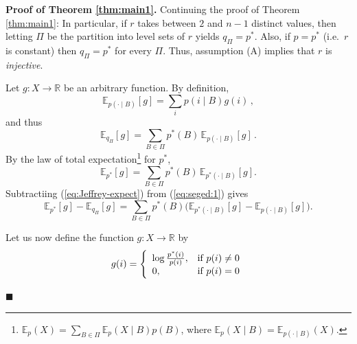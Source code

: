 \documentclass[10pt, letterpaper]{article}%
\theoremstyle{definition}
\renewenvironment{proof}[1][\unskip]{%
\par
\noindent
\textbf{Proof #1.}
\noindent}
{\hfill$\blacksquare$

\bigskip}
\newcommand{\E}{\mathbb E}
\newcommand{\1}{\mathbf 1}
\begin{document}
\begin{proof}[of Theorem \ref{thm:main1}]
	Continuing the proof of Theorem \ref{thm:main1}: In particular, if $r$ takes between $2$ and $n-1$ distinct values, then letting $\Pi$ be the partition into
	level sets of $r$ yields $q_\Pi=p^*$. Also, if $p=p^*$ (i.e.\ $r$ is constant) then $q_\Pi=p^*$ for every $\Pi$.
	Thus, assumption (A) implies that $r$ is \emph{injective}.
	
	\noindent Let $g:X\to \mathbb{R}$ be an arbitrary function. By definition,
	\begin{equation}
	    \E_{p(\cdot\mid B)}[g] = \sum_{i}p(i\mid B)g(i)\,,
	\end{equation}
	and thus
	\begin{equation}\label{eq:Jeffrey-expect}
		\E_{q_\Pi}[g]=\sum_{B\in\Pi} p^*(B)\,\E_{p(\cdot\mid B)}[g]\,.
	\end{equation}
	By the law of total expectation\footnote{$\E_{p}(X) = \sum_{B\in\Pi}\E_{p}(X\mid B)p(B)$, where $\E_{p}(X\mid B) = \E_{p(\cdot\mid B)}(X)$.}
	for $p^*$,
	\begin{equation}\label{eq:seged:1}
		\E_{p^*}[g]=\sum_{B\in\Pi} p^*(B)\,\E_{p^*(\cdot\mid B)}[g].
	\end{equation}
	Subtractiing (\ref{eq:Jeffrey-expect}) from (\ref{eq:seged:1}) gives
	\begin{equation}\label{eq:loss-decomp}
		\E_{p^*}[g]-\E_{q_{\Pi}}[g]
			=\sum_{B\in\Pi} p^*(B)\Big(\E_{p^*(\cdot\mid B)}[g]-\E_{p(\cdot\mid B)}[g]\Big).
	\end{equation}
	
	\noindent Let us now define the function $g\colon X\to\mathbb{R}$ by
	\begin{equation}\label{def:g}
		g(i)=\left\{
  \begin{array}{ll}
    \log\frac{p^*(i)}{p(i)}, & \hbox{if\ } p(i)\not=0 \\
    0, & \hbox{if\ } p(i)=0
  \end{array}
\right.
	\end{equation}


\end{proof}
\end{document}
